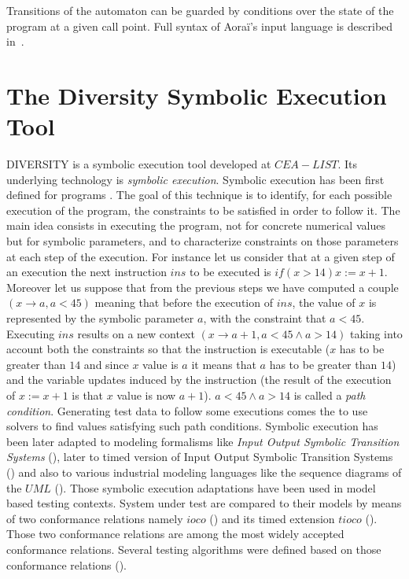 Transitions of the automaton can be guarded by conditions over the state of the
program at a given call point. Full syntax of Aora\"i's input language is 
described in~\cite{aorai}.




\section{The Diversity Symbolic Execution Tool}


DIVERSITY is a symbolic execution tool developed at $CEA-LIST$. Its
underlying technology is {\em symbolic execution}.  Symbolic execution
has been first defined for programs \cite{King75,Clarke,Rama}. The
goal of this technique is to identify, for each possible execution of
the program, the constraints to be satisfied in order to follow it.
The main idea consists in executing the program, not for concrete
numerical values but for symbolic parameters, and to characterize
constraints on those parameters at each step of the execution.  For
instance let us consider that at a given step of an execution the next
instruction $ins$ to be executed is $if(x>14) x:=x+1$. Moreover let us
suppose that from the previous steps we have computed a couple
$(x\rightarrow a, a<45)$ meaning that before the execution of $ins$,
the value of $x$ is represented by the symbolic parameter $a$, with
the constraint that $a<45$. Executing $ins$ results on a new context
$(x\rightarrow a+1 , a<45 \land a>14)$ taking into account both the
constraints so that the instruction is executable ($x$ has to be
greater than $14$ and since $x$ value is $a$ it means that $a$ has to
be greater than $14$) and the variable updates induced by the
instruction (the result of the execution of $x:=x+1$ is that $x$ value
is now $a+1$). $a<45 \land a>14$ is called a {\em path
  condition}. Generating test data to follow some executions comes the
to use solvers to find values satisfying such path conditions.
Symbolic execution has been later adapted to modeling formalisms like
{\em Input Output Symbolic Transition Systems} (\cite{RGLG03,GAL00}),
later to timed version of Input Output Symbolic Transition Systems
(\cite{EGL11,BEGL12}) and also to various industrial modeling
languages like the {sequence diagrams} of the $UML$
(\cite{BGS11}). Those symbolic execution adaptations have been used in
model based testing contexts. System under test are compared to their
models by means of two conformance relations namely {\em $ioco$}
(\cite{Tre96a}) and its timed extension {\em $tioco$}
(\cite{Kri04}). Those two conformance relations are among the most
widely accepted conformance relations. Several testing algorithms were
defined based on those conformance relations (\cite{GLRT06, EGL11,
  BEGL12}).

